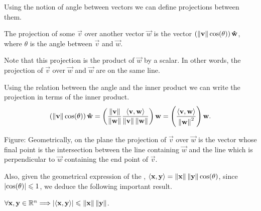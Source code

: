 
Using the notion of angle between vectors we can define projections between them.

\begin{defn}\label{def:orthogonal-projection}
    The projection of some $\vec{v}$ over another vector $\vec{w}$ is the vector $\left(\left\Vert \mathbf{v} \right\Vert\cos(\theta)\right)
    \mathbf{\hat{w}}$, where $\theta$ is the angle between $\vec{v}$ and $\vec{w}$.
\end{defn}

\begin{remark}
    Note that this projection is the product of $\vec{w}$ by a scalar. In other words, the projection of $\vec{v}$ over
    $\vec{w}$ and $\vec{w}$ are on the same line.
\end{remark}

Using the relation between the angle and the inner product we can write the projection in terms of the inner product.
\begin{equation}
    \left(\left\Vert \mathbf{v} \right\Vert\cos(\theta)\right)\mathbf{\hat{w}} = \left(\frac{\left\Vert \mathbf{v} \right\Vert}{\left\Vert \mathbf{w} \right\Vert}\frac{\langle \mathbf{v}, 
    \mathbf{w} \rangle}{\left\Vert \mathbf{v} \right\Vert\left\Vert \mathbf{w} \right\Vert}\right)\mathbf{w} = \left(\frac{\langle \mathbf{v}, \mathbf{w} \rangle}{\left\Vert \mathbf{w} \right\Vert^2}
\right)\mathbf{w}.
\end{equation}

Figure: Geometrically, on the plane the projection of $\vec{v}$ over $\vec{w}$ is the vector whose final point is the intersection
between the line containing $\vec{w}$ and the line which is perpendicular to $\vec{w}$ containing the end point of $\vec{v}$.

Also, given the geometrical expression of the , $\langle \mathbf{x}, \mathbf{y} \rangle = \left\Vert \mathbf{x} \right\Vert
\left\Vert \mathbf{y} \right\Vert\cos(\theta)$, since $\abs{\cos(\theta)}\leqslant 1$, we deduce the following important result.
\begin{lemma}
$\forall\vec{x}, \vec{y}\in\Rtn \implies \abs{\innerp{\vec{x}, \vec{y}}}\leq \vnorm{\vec{x}}\vnorm{\vec{y}}$.
\end{lemma}




